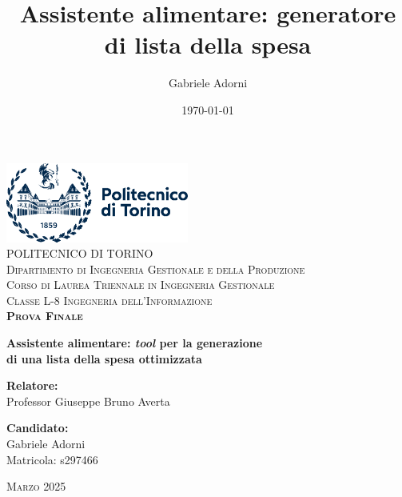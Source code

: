 \documentclass[11pt,a4paper]{article}
\title{Assistente alimentare: generatore di lista della spesa}
\author{Gabriele Adorni}
\date{\today}
\begin{document}
\begin{titlepage}
    \begin{center}
        \vspace*{1cm}
        \includegraphics[width=6cm]{polito_logo.png}\\[2cm]

        \textsc{\LARGE POLITECNICO DI TORINO}\\[0.8cm]
        \textsc{Dipartimento di Ingegneria Gestionale e della Produzione}\\[2cm]

        \textsc{Corso di Laurea Triennale in Ingegneria Gestionale}\\
        \textsc{Classe L-8 Ingegneria dell’Informazione}\\[2cm]

        {\Large\textsc{\textbf{Prova Finale}}\\[1cm]}
        
        {\Large \textbf{Assistente alimentare: \textit{tool} per la generazione\\
        di una lista della spesa ottimizzata}}\\[3cm]

        \begin{flushleft} \large
            \textbf{Relatore:}\\
            Professor Giuseppe Bruno Averta
        \end{flushleft}

        \begin{flushright} \large
            \textbf{Candidato:}\\
            Gabriele Adorni\\
            Matricola: s297466
        \end{flushright}

        \vfill

        \textsc{Marzo 2025}

    \end{center}
\end{titlepage}
\end{document}
